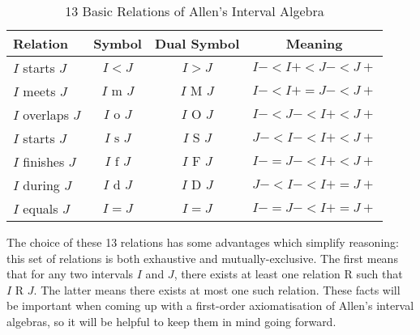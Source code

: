 \documentclass[../main.tex]{subfiles}
\begin{document}
\begin{table}[htpb]
  \centering
  \begin{tabular}{|l|c|c|c|}
    \hline
    Relation & Symbol & Dual Symbol & Meaning \\
    \hline
    \(I\) starts \(J\)
             & \(I < J\)
             & \(I > J\)
             & \(I- < I+ < J- < J+\)\\
    \(I\) meets \(J\)
             & \(I\text{ m }J\)
             & \(I\text{ M }J\)
             & \(I- < I+ = J - < J+\)\\
    \(I\) overlaps \(J\)
             & \(I\text{ o }J\)
             & \(I\text{ O }J\)
             & \(I- < J- < I+ < J+\)\\
    \(I\) starts \(J\)
             & \(I\text{ s }J\)
             & \(I\text{ S }J\)
             & \(J- < I- < I+ < J+\)\\
    \(I\) finishes \(J\)
             & \(I\text{ f }J\)
             & \(I\text{ F }J\)
             & \(I- = J- < I+ < J+\)\\
    \(I\) during \(J\)
             & \(I\text{ d }J\)
             & \(I\text{ D }J\)
             & \(J- < I- < I+ = J+\)\\
    \(I\) equals \(J\)
             & \(I = J\)
             & \(I = J\)
             & \(I- = J- < I+ = J+\)\\
    \hline
  \end{tabular}
  \caption{13 Basic Relations of Allen's Interval Algebra}
  \label{tab:basic_relations}
\end{table}

The choice of these 13 relations has some advantages which simplify reasoning: this set of
relations is both exhaustive and mutually-exclusive. The first means that for any two intervals
$I$ and $J$, there exists at least one relation R  such that $I\text{ R }J$. The latter
means there exists at most one such relation. These facts will be important when coming up
with a first-order axiomatisation of Allen's interval algebras, so it will be helpful to keep them
in mind going forward.
\end{document}
